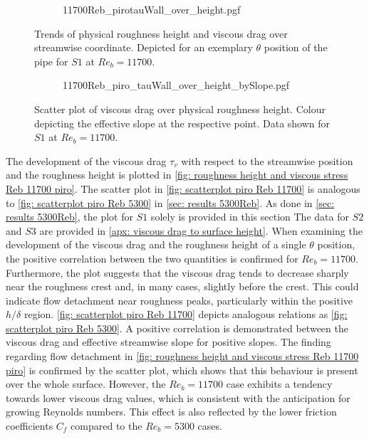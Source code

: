 \begin{figure}
    \centering
    \begin{subfigure}{0.75\textwidth}
        \centering
        {11700Reb_pirotauWall_over_height.pgf}
    \end{subfigure}
    \caption[Trends of physical roughness height and viscous drag over streamwise coordinate for $Re_b = 11700$]{Trends of physical roughness height and viscous drag over streamwise coordinate. Depicted for an exemplary $\theta$ position of the pipe for $S1$ at $Re_b = 11700$.}
    \label{fig: roughness height and viscous stress Reb 11700 piro}
\end{figure}
\begin{figure}
    \centering
    \begin{subfigure}{0.7\textwidth}
        \hspace{0.9cm}
        {11700Reb_piro_tauWall_over_height_bySlope.pgf}
    \end{subfigure}
    \caption[Scatter plot of viscous drag over physical roughness height at $Re_b = 11700$]{Scatter plot of viscous drag over physical roughness height. Colour depicting the effective slope at the respective point. Data shown for $S1$ at $Re_b = 11700$.}
    \label{fig: scatterplot piro Reb 11700}
\end{figure}
The development of the viscous drag $\tau_v$ with respect to  the streamwise position and the roughness height is plotted in \autoref{fig: roughness height and viscous stress Reb 11700 piro}.
The scatter plot in \autoref{fig: scatterplot piro Reb 11700} is analogous to \autoref{fig: scatterplot piro Reb 5300} in \autoref{sec: results 5300Reb}.
As done in \autoref{sec: results 5300Reb}, the plot for $S1$ solely is provided in this section 
The data for $S2$ and $S3$ are provided in \autoref{apx: viscous drag to surface height}.
When examining the development of the viscous drag and the roughness height of a single $\theta$ position, the positive correlation between the two quantities is confirmed for $Re_b = 11700$.
Furthermore, the plot suggests that the viscous drag tends to decrease sharply near the roughness crest and, in many cases, slightly before the crest.
This could indicate flow detachment near roughness peaks, particularly within the positive $h/\delta$ region.
\autoref{fig: scatterplot piro Reb 11700} depicts analogous relations as \autoref{fig: scatterplot piro Reb 5300}.
A positive correlation is demonstrated between the viscous drag and effective streamwise slope for positive slopes.
The finding regarding flow detachment in \autoref{fig: roughness height and viscous stress Reb 11700 piro} is confirmed by the scatter plot, which shows that this behaviour is present over the whole surface.
However, the $Re_b = 11700$ case exhibits a tendency towards lower viscous drag values, which is consistent with the anticipation for growing Reynolds numbers.
This effect is also reflected by the lower friction coefficients $C_f$ compared to the $Re_b = 5300$ cases.

